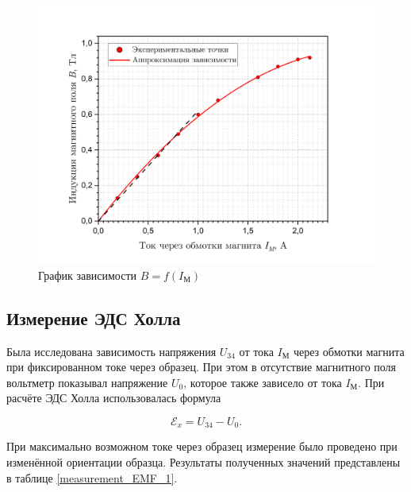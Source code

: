 \documentclass[a4paper, 12pt]{article}
\begin{document}
    \begin{figure}[H]
        \centering
        \includegraphics[width = 15 cm]{images/graph_graduation.png}
        \caption{График зависимости $B = f(I_\text{М})$}
        \label{graph:graduation}
    \end{figure}

    \subsection{Измерение ЭДС Холла}

    Была исследована зависимость напряжения $U_{34}$ от тока $I_\text{М}$ через обмотки магнита при фиксированном токе через образец. При этом в отсутствие магнитного поля вольтметр показывал напряжение $U_0$, которое также зависело от тока $I_\text{М}$. При расчёте ЭДС Холла использовалась формула

    \begin{equation}
        \mathcal{E}_x = U_{34} - U_0.
    \end{equation}
    
    При максимально возможном токе через образец измерение было проведено при изменённой ориентации образца. Результаты полученных значений представлены в таблице \ref{measurement_EMF_1}.
\end{document}
